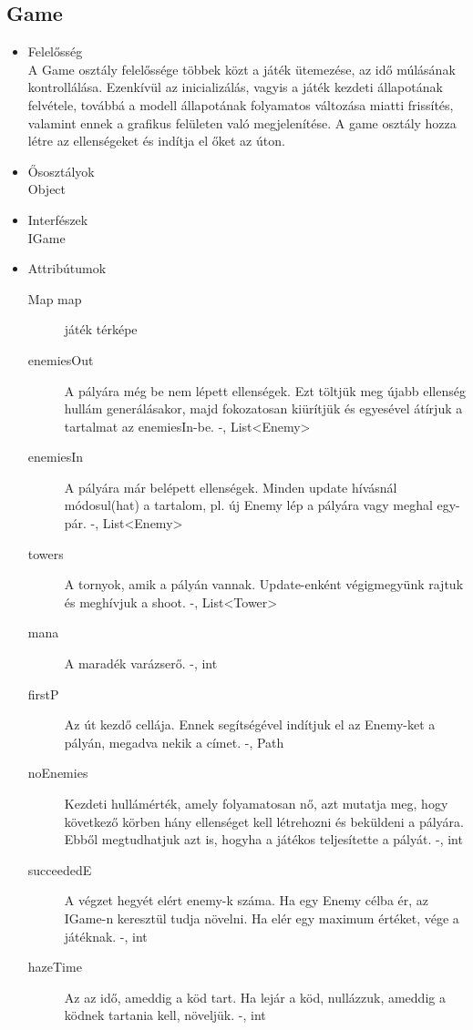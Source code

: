 \subsection{Game}
\begin{itemize}
\item Felelősség\\
A Game osztály felelőssége többek közt a játék ütemezése, az idő múlásának kontrollálása. Ezenkívül az inicializálás, vagyis a játék kezdeti állapotának felvétele, továbbá a modell állapotának folyamatos változása miatti frissítés, valamint ennek a grafikus felületen való megjelenítése. A game osztály hozza létre az ellenségeket és indítja el őket az úton.
\item Ősosztályok\\
Object
\item Interfészek\\
IGame
\item Attribútumok\\
	\begin{description}
		\item[Map map] játék térképe
\item[enemiesOut] A pályára még be nem lépett ellenségek. Ezt töltjük meg újabb ellenség hullám generálásakor, majd fokozatosan kiürítjük és egyesével átírjuk a tartalmat az enemiesIn-be. -, List<Enemy>
\item[enemiesIn] A pályára már belépett ellenségek. Minden update hívásnál módosul(hat) a tartalom, pl. új Enemy lép a pályára vagy meghal egy-pár. -, List<Enemy>
\item[towers] A tornyok, amik a pályán vannak. Update-enként végigmegyünk rajtuk és meghívjuk a shoot. -, List<Tower>
\item[mana] A maradék varázserő. -, int
\item[firstP] Az út kezdő cellája. Ennek segítségével indítjuk el az Enemy-ket a pályán, megadva nekik a címet. -, Path
\item[noEnemies] Kezdeti hullámérték, amely folyamatosan nő, azt mutatja meg, hogy következő körben hány ellenséget kell létrehozni és beküldeni a pályára. Ebből megtudhatjuk azt is, hogyha a játékos teljesítette a pályát. -, int
\item[succeededE] A végzet hegyét elért enemy-k száma. Ha egy Enemy célba ér, az IGame-n keresztül tudja növelni. Ha elér egy maximum értéket, vége a játéknak. -, int
\item[hazeTime] Az az idő, ameddig a köd tart. Ha lejár a köd, nullázzuk, ameddig a ködnek tartania kell, növeljük. -, int




\end{description}
\end{itemize}
